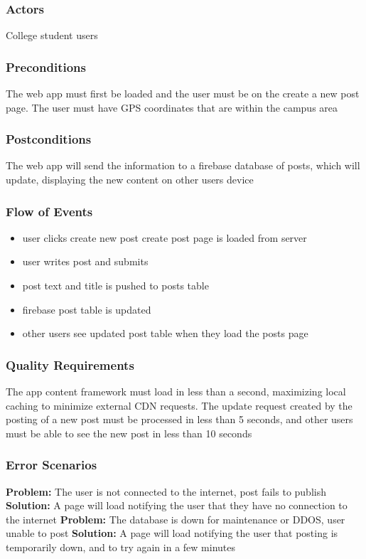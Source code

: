 \documentclass[12pt]{article}
\begin{document}
\subsubsection{Actors}
College student users

\subsubsection{Preconditions}
The web app must first be loaded and the user must be on the create a new post page. The user must have GPS coordinates that are within the campus area

\subsubsection{Postconditions}
The web app will send the information to a firebase database of posts, which will update, displaying the new content on other users device

\subsubsection{Flow of Events}
\begin{itemize}
  \item user clicks create new post create post page is loaded from server
  \item user writes post and submits
  \item post text and title is pushed to posts table
  \item firebase post table is updated
  \item other users see updated post table when they load the posts page
\end{itemize}

\subsubsection{Quality Requirements}
The app content framework must load in less than a second, maximizing local caching to minimize external CDN requests.
The update request created by the posting of a new post must be processed in less than 5 seconds, and other users must be able to see the new post in less than 10 seconds


\subsubsection{Error Scenarios}
\textbf{Problem:}
 The user is not connected to the internet, post fails to publish
\textbf{Solution:}
  A page will load notifying the user that they have no connection to the internet
\textbf{Problem:}
  The database is down for maintenance or DDOS, user unable to post
\textbf{Solution:}
  A page will load notifying the user that posting is temporarily down, and to try again in a few minutes
\end{document}
